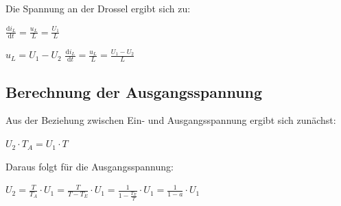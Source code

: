 Die Spannung an der Drossel ergibt sich zu:

\begin{minipage}[t]{0.23\columnwidth}
\textbf{}

\end{minipage}
\hfill
\begin{minipage}[c]{0.73\columnwidth}
\textbf{}

\end{minipage}


\begin{minipage}[t]{0.23\columnwidth}

$
\boxed{\frac{\mathrm{d}i_L}{\mathrm{d}t} = \frac{u_L}{L} = \frac{U_1}{L}}
$
\end{minipage}
\hfill
\begin{minipage}[c]{0.73\columnwidth}

$
\boxed{u_L = U_1 - U_2}
$
$
\boxed{\frac{\mathrm{d}i_L}{\mathrm{d}t} = \frac{u_L}{L} = \frac{U_1 - U_2}{L}}
$
\end{minipage}





\subsection{Berechnung der Ausgangsspannung}

Aus der Beziehung zwischen Ein- und Ausgangsspannung ergibt sich zunächst:

$
\boxed{U_2 \cdot T_A = U_1 \cdot T}
$

Daraus folgt für die Ausgangsspannung:

$
\boxed{U_2 = \frac{T}{T_A} \cdot U_1 = \frac{T}{T - T_E} \cdot U_1 = \frac{1}{1 - \frac{T_E}{T}} \cdot U_1 = \frac{1}{1 - a} \cdot U_1}
$


